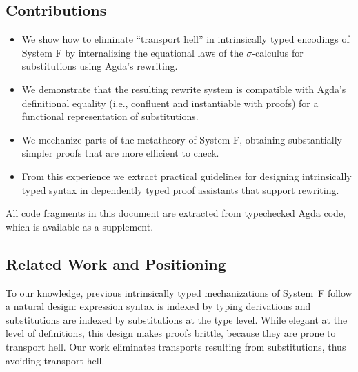 \documentclass[manuscript,screen,review,anonymous,acmsmall]{acmart}
\begin{document}
\subsection*{Contributions}
\begin{itemize}
\item 
  We show how to eliminate ``transport hell'' in intrinsically typed
  encodings of System F by internalizing the
  equational laws of the $\sigma$-calculus for substitutions using Agda’s rewriting. 
\item 
  We demonstrate that the resulting rewrite system is compatible with Agda’s
  definitional equality (i.e., confluent and instantiable with proofs) for
  a functional representation of substitutions.
\item 
  We mechanize parts of the metatheory of System F,
  obtaining substantially simpler proofs that are more efficient to check.
\item 
  From this experience we extract practical guidelines for designing
  intrinsically typed syntax in dependently typed proof assistants
  that support rewriting.
\end{itemize}

All code fragments in this document are extracted from typechecked
Agda code, which is available as a supplement.

\subsection*{Related Work and Positioning}

To our knowledge, previous intrinsically typed mechanizations of
System~F 
\cite{10.1007/978-3-030-33636-3_10,10.1145/3678000.3678201,DBLP:journals/jar/BentonHKM12}
follow a natural design: expression syntax is indexed by typing
derivations and substitutions are indexed by substitutions at the type
level. While elegant at the level of definitions, this design makes
proofs brittle, because they are prone to transport hell. 
Our work eliminates transports resulting from substitutions, thus avoiding transport hell.
\end{document}
